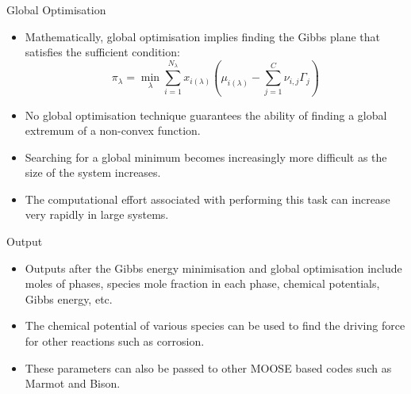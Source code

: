       \begin{frame}{Global Optimisation}
         \begin{itemize}
             \item Mathematically, global optimisation implies finding the Gibbs plane that satisfies the sufficient condition: \[\pi_{\lambda} = \min_{\lambda} \sum_{i=1}^{N_{\lambda}}x_{i({\lambda})} \left (\mu_{i({\lambda})} - \sum_{j=1}^C \nu_{i,j}\Gamma_j \right )\]
             \item No global optimisation technique guarantees the ability of finding a global extremum of a non-convex function.
             \item Searching for a global minimum becomes increasingly more difficult as the size of the system increases.
             \item The computational effort associated with performing this task can increase very rapidly in large systems.
         \end{itemize}
     \end{frame}

     \begin{frame}{Output}
         \begin{itemize}
             \item Outputs after the Gibbs energy minimisation and global optimisation include moles of phases, species mole fraction in each phase, chemical potentials, Gibbs energy, etc.
             \item The chemical potential of various species can be used to find the driving force for other reactions such as corrosion.
             \item These parameters can also be passed to other MOOSE based codes such as {Marmot} and {Bison}.
         \end{itemize}
     \end{frame}